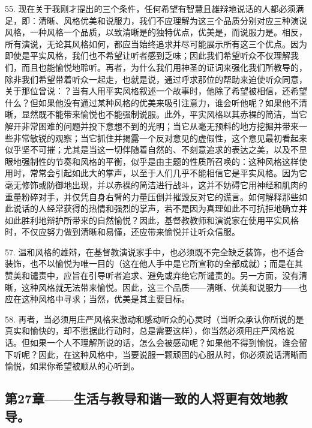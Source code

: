 55. 现在关于我刚才提出的三个条件，任何希望有智慧且雄辩地说话的人都必须满足，即：清晰、风格优美和说服力，我们不应理解为这三个品质分别对应三种演说风格，一种风格一个品质，以致清晰是的独特优点，优美是，而说服力是。相反，所有演说，无论其风格如何，都应当始终追求并尽可能展示所有这三个优点。因为即使是平实风格，我们也不希望让听者感到乏味；因此我们希望听众不仅理解我们，而且也能愉悦地聆听。再者，为什么我们用神圣的证词来强化我们所教导的，除非我们希望带着听众一起走，也就是说，通过呼求那位的帮助来迫使听众同意，关于那位曾说：？当有人用平实风格叙述一个故事时，他除了希望被相信，还希望什么？但如果他没有通过某种风格的优美来吸引注意力，谁会听他呢？如果他不清晰，显然既不能带来愉悦也不能强制说服。此外，平实风格以其赤裸的简洁，当它解开非常困难的问题并投下意想不到的光明；当它从毫无预料的地方挖掘并带来一些非常敏锐的观察；当它抓住并揭露一个反对意见的虚假性，这个意见最初看起来似乎坚不可摧；尤其是当这一切伴随着自然的、不刻意追求的表达之美，以及不显眼地强制性的节奏和风格的平衡，似乎是由主题的性质所召唤的：这种风格这样使用时，常常会引起如此大的掌声，以至于人们几乎不能相信它是平实风格。因为它毫无修饰或防御地出现，并以赤裸的简洁进行战斗，这并不妨碍它用神经和肌肉的重量粉碎对手，并仅凭自身右臂的力量压倒并摧毁反对它的谎言。如何解释那些如此说话的人经常获得的热情和强烈的掌声，若不是因为真理如此不可抗拒地确立并如此胜利地辩护所带来的自然愉悦？因此，基督教教师和演说家在使用平实风格时，不仅应努力做到清晰和易懂，还应带来愉悦并让听众信服。\par

57. 温和风格的雄辩，在基督教演说家手中，也必须既不完全缺乏装饰，也不适合装饰，也不以愉悦为唯一目的（这在他人手中是它所宣称的全部成就）；而是在其赞美和谴责中，应旨在引导听者追求、避免或弃绝它所谴责的。另一方面，没有清晰，这种风格就无法带来愉悦。因此，这三个品质——清晰、优美和说服力——也应在这种风格中寻求；当然，优美是其主要目标。\par

58. 再者，当必须用庄严风格来激动和感动听众的心灵时（当听众承认你所说的是真实和愉快的，却不愿据此行动时，总是需要这样），你当然必须用庄严风格说话。但如果一个人不理解所说的话，怎么会被感动呢？如果他不得到愉悦，谁会留下听呢？因此，在这种风格中，当要说服一颗顽固的心服从时，你必须说话清晰而愉悦，如果你希望被顺从的心听到。\par


\subsection{第27章——生活与教导和谐一致的人将更有效地教导。}

